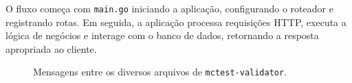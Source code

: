 O fluxo começa com \texttt{main.go} iniciando a aplicação, configurando o roteador e registrando rotas. Em seguida, a aplicação processa requisições HTTP, executa a lógica de negócios e interage com o banco de dados, retornando a resposta apropriada ao cliente.


\begin{figure}[h!]%
    \centering%
    \caption{Mensagens entre os diversos arquivos de \texttt{mctest-validator}.}
    \label{fig:plantuml}
\end{figure}%





